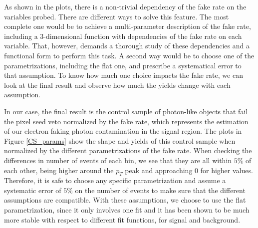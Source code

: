 As shown in the plots, there is a non-trivial dependency of the fake rate on the variables probed. There are different ways to solve this feature. The most complete one would be to achieve a multi-parameter description of the fake rate, including a 3-dimensional function with dependencies of the fake rate on each variable. That, however, demands a thorough study of these dependencies and a functional form to perform this task. A second way would be to choose one of the parametrizations, including the flat one, and prescribe a systematical error to that assumption. To know how much one choice impacts the fake rate, we can look at the final result and observe how much the yields change with each assumption.

In our case, the final result is the control sample of photon-like objects that fail the pixel seed veto normalized by the fake rate, which represents the estimation of our electron faking photon contamination in the signal region. The plots in Figure \ref{CS_params} show the shape and yields of this control sample when normalized by the different parametrizations of the fake rate. When checking the differences in number of events of each bin, we see that they are all within $5\%$ of each other, being higher around the $p_T$ peak and approaching $0$ for higher values. Therefore, it is safe to choose any specific parametrization and assume a systematic error of $5\%$ on the number of events to make sure that the different assumptions are compatible. With these assumptions, we choose to use the flat parametrization, since it only involves one fit and it has been shown to be much more stable with respect to different fit functions, for signal and background.


